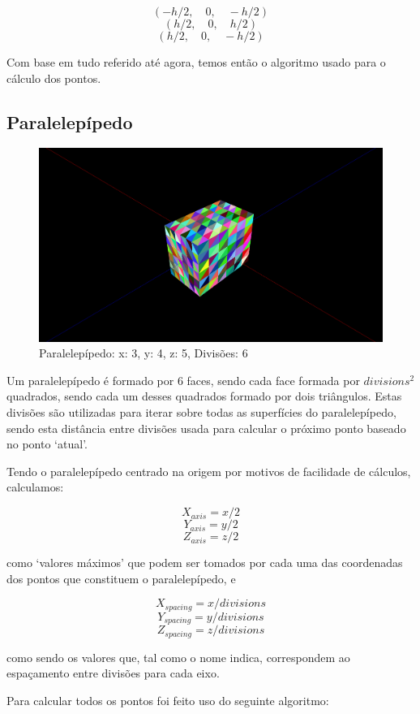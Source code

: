 \documentclass[a4paper]{article}
\begin{document}
\[(-h/2, \quad 0, \quad -h/2)\]
\[(h/2, \quad  0, \quad  h/2)\]
\[(h/2, \quad  0, \quad -h/2)\]

Com base em tudo referido até agora, temos então o algoritmo usado para o cálculo dos pontos.


\subsection{Paralelepípedo}
\begin{figure}[H]
    \centering
    \includegraphics[width=\textwidth]{box.png}
    \caption{Paralelepípedo: x: 3, y: 4, z: 5, Divisões: 6}
\end{figure}

Um paralelepípedo é formado por 6 faces, sendo cada face formada por $divisions^2$ quadrados, sendo cada um desses quadrados formado por dois triângulos. Estas divisões são utilizadas para iterar sobre todas as superfícies do paralelepípedo, sendo esta distância entre divisões usada para calcular o próximo ponto baseado no ponto `atual'.

Tendo o paralelepípedo centrado na origem por motivos de facilidade de cálculos, calculamos:

\[X_{axis} = x / 2\]
\[Y_{axis} = y / 2\]
\[Z_{axis} = z / 2\]

como `valores máximos' que podem ser tomados por cada uma das coordenadas dos pontos que constituem o paralelepípedo, e

\[X_{spacing} = x / divisions\]
\[Y_{spacing} = y / divisions\]
\[Z_{spacing} = z / divisions\]

como sendo os valores que, tal como o nome indica, correspondem ao espaçamento entre divisões para cada eixo.

Para calcular todos os pontos foi feito uso do seguinte algoritmo:
\end{document}

